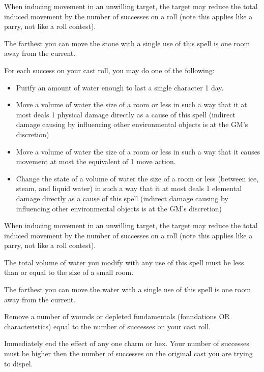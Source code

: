 \begin{GRPtablewide}
{		When inducing movement in an unwilling target, the target may reduce the total induced movement by the number of successes on a  roll (note this applies like a parry, not like a roll contest).

		The farthest you can move the stone with a single use of this spell is one room away from the current.
	}

	{%
		For each success on your cast roll, you may do one of the following:
			\begin{itemize}
				\item Purify an amount of water enough to last a single character 1 day.
				\item Move a volume of water the size of a room or less in such a way that it at most deals 1 physical damage directly as a cause of this spell (indirect damage causing by influencing other environmental objects is at the GM's discretion)
				\item Move a volume of water the size of a room or less in such a way that it causes movement at most the equivalent of 1 move action.
				\item Change the state of a volume of water the size of a room or less (between ice, steam, and liquid water) in such a way that it at most deals 1 elemental damage directly as a cause of this spell (indirect damage causing by influencing other environmental objects is at the GM's discretion)
			\end{itemize}
		When inducing movement in an unwilling target, the target may reduce the total induced movement by the number of successes on a  roll (note this applies like a parry, not like a roll contest).

		The total volume of water you modify with any use of this spell must be less than or equal to the size of a small room.

		The farthest you can move the water with a single use of this spell is one room away from the current.
	}

	{%
		Remove a number of wounds or depleted fundamentals (foundations OR characteristics) equal to the number of successes on your cast roll.
	}

	{%
		Immediately end the effect of any one charm or hex. Your number of successes must be higher then the number of successes on the original cast you are trying to dispel.

}
\end{GRPtablewide}
